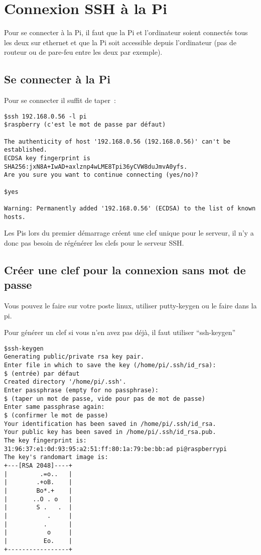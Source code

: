 \section{Connexion SSH à la Pi}

Pour se connecter à la Pi, il faut que la Pi et l'ordinateur soient connectés tous les deux sur ethernet et que la Pi soit accessible depuis l'ordinateur (pas de routeur ou de pare-feu entre les deux par exemple). 

\subsection{Se connecter à la Pi}

Pour se connecter il suffit de taper~:
\begin{verbatim}
$ssh 192.168.0.56 -l pi
$raspberry (c'est le mot de passe par défaut)

The authenticity of host '192.168.0.56 (192.168.0.56)' can't be established.
ECDSA key fingerprint is SHA256:jxN8A+IwAD+axlznp4wLME8Tpi36yCVW8duJmvA0yfs.
Are you sure you want to continue connecting (yes/no)? 

$yes

Warning: Permanently added '192.168.0.56' (ECDSA) to the list of known hosts.
\end{verbatim}

Les Pis lors du premier démarrage créent une clef unique pour le serveur, il n'y a donc pas besoin de régénérer les clefs pour le serveur SSH.

\subsection{Créer une clef pour la connexion sans mot de passe}

Vous pouvez le faire sur votre poste linux, utiliser putty-keygen ou le faire dans la pi.

Pour générer un clef si vous n'en avez pas déjà, il faut utiliser ``ssh-keygen''

\begin{verbatim}
$ssh-keygen
Generating public/private rsa key pair.
Enter file in which to save the key (/home/pi/.ssh/id_rsa): 
$ (entrée) par défaut
Created directory '/home/pi/.ssh'.
Enter passphrase (empty for no passphrase): 
$ (taper un mot de passe, vide pour pas de mot de passe)
Enter same passphrase again: 
$ (confirmer le mot de passe)
Your identification has been saved in /home/pi/.ssh/id_rsa.
Your public key has been saved in /home/pi/.ssh/id_rsa.pub.
The key fingerprint is:
31:96:37:e1:0d:93:95:a2:51:ff:80:1a:79:be:bb:ad pi@raspberrypi
The key's randomart image is:
+---[RSA 2048]----+
|         .=o..   |
|        .+oB.    |
|        Bo*.+    |
|       ..O . o   |
|        S .   .  |
|           .     |
|          .      |
|           o     |
|          Eo.    |
+-----------------+
\end{verbatim}

